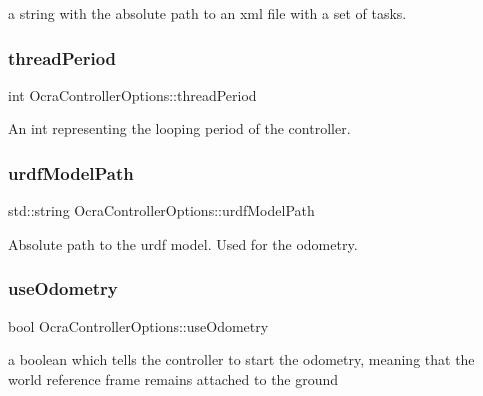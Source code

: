 a string with the absolute path to an xml file with a set of tasks. \hypertarget{classOcraControllerOptions_ab706ae593bf5b30433cfd6f957b51db4}{}\label{classOcraControllerOptions_ab706ae593bf5b30433cfd6f957b51db4} 
\subsubsection{\texorpdfstring{thread\+Period}{threadPeriod}}
{\footnotesize\ttfamily int Ocra\+Controller\+Options\+::thread\+Period}

An int representing the looping period of the controller. \hypertarget{classOcraControllerOptions_a697196e6267b2a519dd0bcc2bc03ab73}{}\label{classOcraControllerOptions_a697196e6267b2a519dd0bcc2bc03ab73} 
\subsubsection{\texorpdfstring{urdf\+Model\+Path}{urdfModelPath}}
{\footnotesize\ttfamily std\+::string Ocra\+Controller\+Options\+::urdf\+Model\+Path}

Absolute path to the urdf model. Used for the odometry. \hypertarget{classOcraControllerOptions_a335f09b446b6d10e2a8e6eb453391d9e}{}\label{classOcraControllerOptions_a335f09b446b6d10e2a8e6eb453391d9e} 
\subsubsection{\texorpdfstring{use\+Odometry}{useOdometry}}
{\footnotesize\ttfamily bool Ocra\+Controller\+Options\+::use\+Odometry}

a boolean which tells the controller to start the odometry, meaning that the world reference frame remains attached to the ground \hypertarget{classOcraControllerOptions_af3a98210531cf667c2838e45b470a66e}{}\label{classOcraControllerOptions_af3a98210531cf667c2838e45b470a66e} 
